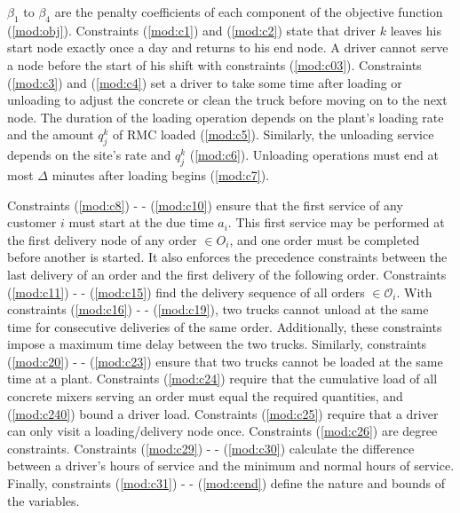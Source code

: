 \documentclass{article}
\begin{document}
$\beta_1$ to $\beta_4$ are the penalty coefficients of each component of the objective function (\ref{mod:obj}). Constraints (\ref{mod:c1}) and (\ref{mod:c2}) state that driver $k$ leaves his start node exactly once a day and returns to his end node. A driver cannot serve a node before the start of his shift with constraints (\ref{mod:c03}). Constraints (\ref{mod:c3}) and (\ref{mod:c4}) set a driver to take some time after loading or unloading to adjust the concrete or clean the truck before moving on to the next node. The duration of the loading operation depends on the plant's loading rate and the amount $q^k_j$ of RMC loaded (\ref{mod:c5}). Similarly, the unloading service depends on the site's rate and $q^k_j$ (\ref{mod:c6}). Unloading operations must end at most $\Delta$ minutes after loading begins (\ref{mod:c7}).

Constraints (\ref{mod:c8}) - - (\ref{mod:c10}) ensure that the first service of any customer $i$ must start at the due time $a_i$. This first service may be performed at the first delivery node of any order $\in O_i$, and one order must be completed before another is started. It also enforces the precedence constraints between the last delivery of an order and the first delivery of the following order.
Constraints (\ref{mod:c11}) - - (\ref{mod:c15}) find the delivery sequence of all orders $\in \mathcal{O}_i$. With constraints (\ref{mod:c16}) - - (\ref{mod:c19}), two trucks cannot unload at the same time for consecutive deliveries of the same order. Additionally, these constraints impose a maximum time delay between the two trucks. Similarly, constraints (\ref{mod:c20}) - - (\ref{mod:c23}) ensure that two trucks cannot be loaded at the same time at a plant. Constraints (\ref{mod:c24}) require that the cumulative load of all concrete mixers serving an order must equal the required quantities, and (\ref{mod:c240}) bound a driver load.  Constraints (\ref{mod:c25}) require that a driver can only visit a loading/delivery node once. Constraints (\ref{mod:c26}) are degree constraints. Constraints (\ref{mod:c29}) - - (\ref{mod:c30}) calculate the difference between a driver's hours of service and the minimum and normal hours of service. Finally, constraints (\ref{mod:c31}) - - (\ref{mod:cend}) define the nature and bounds of the variables.
\end{document}
